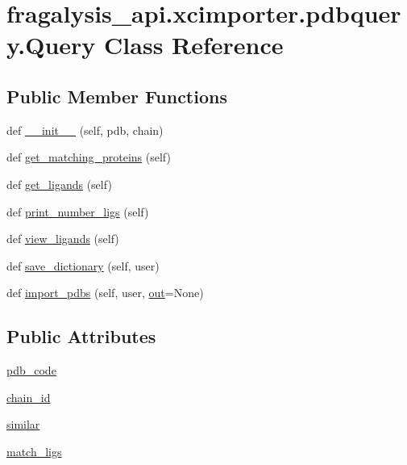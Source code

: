 \hypertarget{classfragalysis__api_1_1xcimporter_1_1pdbquery_1_1_query}{}\section{fragalysis\+\_\+api.\+xcimporter.\+pdbquery.\+Query Class Reference}
\label{classfragalysis__api_1_1xcimporter_1_1pdbquery_1_1_query}
\subsection*{Public Member Functions}
\begin{DoxyCompactItemize}
\item 
def \hyperlink{classfragalysis__api_1_1xcimporter_1_1pdbquery_1_1_query_a4c9143433e01d6c355246e1ea4f86265}{\+\_\+\+\_\+init\+\_\+\+\_\+} (self, pdb, chain)
\item 
def \hyperlink{classfragalysis__api_1_1xcimporter_1_1pdbquery_1_1_query_a0beef45de2126a3837b02050e1b90a74}{get\+\_\+matching\+\_\+proteins} (self)
\item 
def \hyperlink{classfragalysis__api_1_1xcimporter_1_1pdbquery_1_1_query_a846d2bc401e56a452222d95b630fb9b0}{get\+\_\+ligands} (self)
\item 
def \hyperlink{classfragalysis__api_1_1xcimporter_1_1pdbquery_1_1_query_a36dfa365ad219285d470107eba4e7080}{print\+\_\+number\+\_\+ligs} (self)
\item 
def \hyperlink{classfragalysis__api_1_1xcimporter_1_1pdbquery_1_1_query_ada4ce4d98d911a33baabe42bf38a4aa1}{view\+\_\+ligands} (self)
\item 
def \hyperlink{classfragalysis__api_1_1xcimporter_1_1pdbquery_1_1_query_a42babe6a340aaf0b2dcc84ea5d0c0b11}{save\+\_\+dictionary} (self, user)
\item 
def \hyperlink{classfragalysis__api_1_1xcimporter_1_1pdbquery_1_1_query_a5be8d71963fc482622a0b1167636718c}{import\+\_\+pdbs} (self, user, \hyperlink{namespacefragalysis__api_1_1xcimporter_1_1pdbquery_a7e1833466eb7f1ed11f7bf148033aa2b}{out}=None)
\end{DoxyCompactItemize}
\subsection*{Public Attributes}
\begin{DoxyCompactItemize}
\item 
\hyperlink{classfragalysis__api_1_1xcimporter_1_1pdbquery_1_1_query_aa773c64b22dedb31eb01f3286a2e1a53}{pdb\+\_\+code}
\item 
\hyperlink{classfragalysis__api_1_1xcimporter_1_1pdbquery_1_1_query_a79cbf79b07436d26929d7576a5f687da}{chain\+\_\+id}
\item 
\hyperlink{classfragalysis__api_1_1xcimporter_1_1pdbquery_1_1_query_a14c73f40bf22f1b1e4388b9215307ee2}{similar}
\item 
\hyperlink{classfragalysis__api_1_1xcimporter_1_1pdbquery_1_1_query_a5162fe822deae38446960b3593b17aa5}{match\+\_\+ligs}
\end{DoxyCompactItemize}


